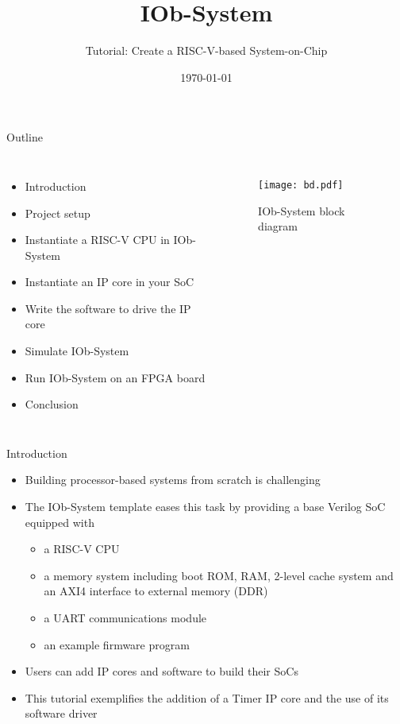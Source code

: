 \documentclass [xcolor=svgnames, t] {beamer}
\title[IOb-System Presentation]{IOb-System}
\subtitle{Tutorial: Create a RISC-V-based System-on-Chip}
\institute[IObundle Lda.]{IObundle Lda.}
\date{\today}
\begin{document}
\begin{frame}
 \titlepage
\end{frame}


\begin{frame}{Outline}
\begin{center}
  \begin{columns}[onlytextwidth]
  \begin{itemize}
  \item Introduction
  \item Project setup
  \item Instantiate a RISC-V CPU in IOb-System
  \item Instantiate an IP core in your SoC
  \item Write the software to drive the IP core
  \item Simulate IOb-System
  \item Run IOb-System on an FPGA board
  \item Conclusion
  \end{itemize}
    \begin{figure}
      \centering
      \texttt{[image: bd.pdf]}
      \caption{IOb-System block diagram}
      \label{fig:my_label}
    \end{figure}
  \end{columns}
\end{center}
\end{frame}


\begin{frame}{Introduction}
\begin{center}
    \begin{itemize}
      \item Building processor-based systems from scratch is challenging
      \item The IOb-System template eases this task by providing a base Verilog SoC equipped with
        \begin{itemize}
        \item a RISC-V CPU
        \item a memory system including boot ROM, RAM, 2-level cache system and an AXI4 interface to external memory (DDR)
        \item a UART communications module
        \item an example firmware program
        \end{itemize}
      \item Users can add IP cores and software to build their SoCs
      \item This tutorial exemplifies the addition of a Timer IP core and the use of its software driver
    \end{itemize}
\end{center}
\end{frame}
\end{document}
